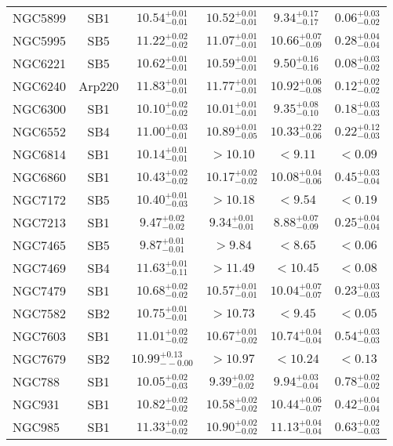 \documentclass[onecolumn]{mn2e}
\begin{document}
{\begin{center}
\begin{longtable}{lccccc}
NGC5899 & SB1 & $10.54_{-0.01}^{+0.01}$ & $10.52_{-0.01}^{+0.01}$ & $9.34_{-0.17}^{+0.17}$ &$0.06_{-0.02}^{+0.03}$ \\
NGC5995 & SB5 & $11.22_{-0.02}^{+0.02}$ & $11.07_{-0.01}^{+0.01}$ & $10.66_{-0.09}^{+0.07}$ &$0.28_{-0.04}^{+0.04}$ \\
NGC6221 & SB5 & $10.62_{-0.01}^{+0.01}$ & $10.59_{-0.01}^{+0.01}$ & $9.50_{-0.16}^{+0.16}$ &$0.08_{-0.02}^{+0.03}$ \\
NGC6240 & Arp220 & $11.83_{-0.01}^{+0.01}$ & $11.77_{-0.01}^{+0.01}$ & $10.92_{-0.08}^{+0.06}$ &$0.12_{-0.02}^{+0.02}$ \\
NGC6300 & SB1 & $10.10_{-0.02}^{+0.02}$ & $10.01_{-0.01}^{+0.01}$ & $9.35_{-0.10}^{+0.08}$ &$0.18_{-0.03}^{+0.03}$ \\
NGC6552 & SB4 & $11.00_{-0.01}^{+0.03}$ & $10.89_{-0.05}^{+0.01}$ & $10.33_{-0.06}^{+0.22}$ &$0.22_{-0.03}^{+0.12}$ \\
NGC6814 & SB1 & $10.14_{-0.01}^{+0.01}$ & $>10.10$ & $<9.11$ &$<0.09$ \\
NGC6860 & SB1 & $10.43_{-0.02}^{+0.02}$ & $10.17_{-0.02}^{+0.02}$ & $10.08_{-0.06}^{+0.04}$ &$0.45_{-0.04}^{+0.03}$ \\
NGC7172 & SB5 & $10.40_{-0.03}^{+0.01}$ & $>10.18$ & $<9.54$ &$<0.19$ \\
NGC7213 & SB1 & $9.47_{-0.02}^{+0.02}$ & $9.34_{-0.01}^{+0.01}$ & $8.88_{-0.09}^{+0.07}$ &$0.25_{-0.04}^{+0.04}$ \\
NGC7465 & SB5 & $9.87_{-0.01}^{+0.01}$ & $>9.84$ & $<8.65$ &$<0.06$ \\
NGC7469 & SB4 & $11.63_{-0.11}^{+0.01}$ & $>11.49$ & $<10.45$ &$<0.08$ \\
NGC7479 & SB1 & $10.68_{-0.02}^{+0.02}$ & $10.57_{-0.01}^{+0.01}$ & $10.04_{-0.07}^{+0.07}$ &$0.23_{-0.03}^{+0.03}$ \\
NGC7582 & SB2 & $10.75_{-0.01}^{+0.01}$ & $>10.73$ & $<9.45$ &$<0.05$ \\
NGC7603 & SB1 & $11.01_{-0.02}^{+0.02}$ & $10.67_{-0.02}^{+0.01}$ & $10.74_{-0.04}^{+0.04}$ &$0.54_{-0.03}^{+0.03}$ \\
NGC7679 & SB2 & $10.99_{--0.00}^{+0.13}$ & $>10.97$ & $<10.24$ &$<0.13$ \\
NGC788 & SB1 & $10.05_{-0.03}^{+0.02}$ & $9.39_{-0.02}^{+0.02}$ & $9.94_{-0.04}^{+0.03}$ &$0.78_{-0.02}^{+0.02}$ \\
NGC931 & SB1 & $10.82_{-0.02}^{+0.02}$ & $10.58_{-0.02}^{+0.02}$ & $10.44_{-0.07}^{+0.06}$ &$0.42_{-0.04}^{+0.04}$ \\
NGC985 & SB1 & $11.33_{-0.02}^{+0.02}$ & $10.90_{-0.02}^{+0.02}$ & $11.13_{-0.04}^{+0.04}$ &$0.63_{-0.03}^{+0.02}$ \\

\end{longtable}
\end{center}}
\end{document}
